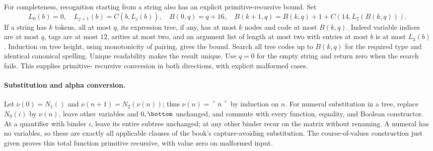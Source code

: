 For completeness, recognition starting from a string also has an explicit
primitive-recursive bound.  Set
\[
 L_0(b)=0,\quad L_{j+1}(b)=C(b,L_j(b)),\quad
 B(0,q)=q+16,\quad
 B(k+1,q)=B(k,q)+1+C(14,L_2(B(k,q))).
\]
If a string has \(k\) tokens, all at most \(q\), its expression tree,
if any, has at most \(k\) nodes and code at most \(B(k,q)\).
Indeed variable indices are at most \(q\), tags are at most \(12\),
arities at most two, and an argument list of length at most two with
entries at most \(b\) is at most \(L_2(b)\).  Induction on tree height,
using monotonicity of pairing, gives the bound.  Search all tree codes up
to \(B(k,q)\) for the required type and identical canonical spelling.
Unique readability makes the result unique.  Use \(q=0\) for the empty
string and return zero when the search fails.  This supplies primitive-
recursive conversion in both directions, with explicit malformed cases.

\paragraph{Substitution and alpha conversion.}
Let \(\nu(0)=N_1()\) and \(\nu(n+1)=N_2(\nu(n))\); thus
\(\nu(n)=\ulcorner\overline n\urcorner\) by induction on \(n\).
For numeral substitution in a tree, replace \(N_0(i)\) by \(\nu(n)\),
leave other variables and \(0,\bottom\) unchanged, and commute with every
function, equality, and Boolean constructor.  At a quantifier with binder
\(i\), leave its entire subtree unchanged; at any other binder recur on
the matrix without renaming.  A numeral has no variables, so these are
exactly all applicable clauses of the book's capture-avoiding substitution.
The course-of-values construction just given proves this total function
primitive recursive, with value zero on malformed input.

